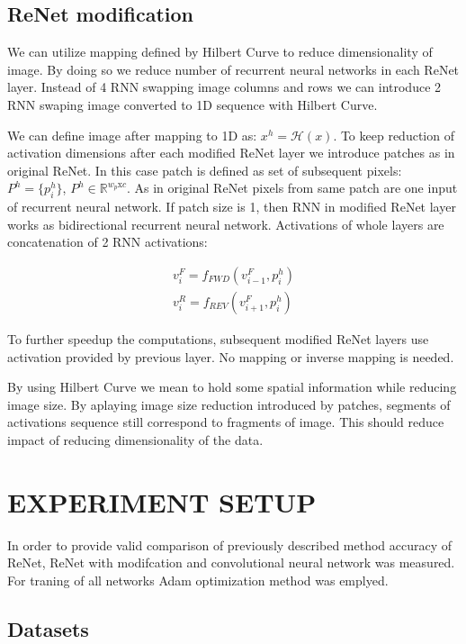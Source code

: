 \documentclass[a4paper, 10 pt, journal]{ieeeconf}
\begin{document}
\subsection{ReNet modification}

We can utilize mapping defined by Hilbert Curve to reduce dimensionality of image. By doing so we reduce number of recurrent neural networks in each ReNet layer. Instead of 4 RNN swapping image columns and rows we can introduce 2 RNN swaping image converted to 1D sequence with Hilbert Curve.

We can define image after mapping to 1D as: $x^{h} = \mathcal{H}(x)$. To keep reduction of activation dimensions after each modified ReNet layer we introduce patches as in original ReNet. In this case patch is defined as set of subsequent pixels: $P^{h} = \{ p_{i}^h \}$, $P^{h} \in \mathbb{R}^{w_p \textrm{x} c}$. As in original ReNet pixels from same patch are one input of recurrent neural network. If patch size is 1, then RNN in modified ReNet layer works as bidirectional recurrent neural network. Activations of whole layers are concatenation of 2 RNN activations:

\begin{gather}
	v_{i}^{F} = f_{FWD}(v_{i-1}^{F}, p_{i}^{h}) \\
	v_{i}^{R} = f_{REV}(v_{i+1}^{F}, p_{i}^{h})
\end{gather}

To further speedup the computations, subsequent modified ReNet layers use activation provided by previous layer. No mapping or inverse mapping is needed.

By using Hilbert Curve we mean to hold some spatial information while reducing image size. By aplaying image size reduction introduced by patches, segments of activations sequence still correspond to fragments of image. This should reduce impact of reducing dimensionality of the data.

\section{EXPERIMENT SETUP}

In order to provide valid comparison of previously described method accuracy of ReNet, ReNet with modifcation and convolutional neural network was measured. For traning of all networks Adam optimization method was emplyed. 

\subsection{Datasets}
\end{document}
